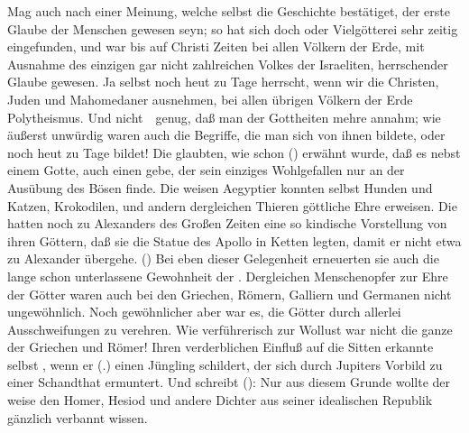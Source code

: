 \begin{aufza}
\item Mag auch nach einer Meinung, welche selbst die Geschichte bestätiget, der erste Glaube der Menschen  gewesen seyn; so hat sich doch  oder Vielgötterei sehr zeitig eingefunden, und war bis auf Christi Zeiten bei allen Völkern der Erde, mit Ausnahme des einzigen gar nicht zahlreichen Volkes der Israeliten, herrschender Glaube gewesen. Ja selbst noch heut zu Tage herrscht, wenn wir die Christen, Juden und Mahomedaner ausnehmen, bei allen übrigen Völkern der Erde Polytheismus. Und nicht~\ genug, daß man der Gottheiten mehre annahm; wie äußerst unwürdig waren auch die Begriffe, die man sich von ihnen bildete, oder noch heut zu Tage bildet! Die  glaubten, wie schon () erwähnt wurde, daß es nebst einem  Gotte, auch einen  gebe, der sein einziges Wohlgefallen nur an der Ausübung des Bösen finde. Die weisen Aegyptier konnten selbst Hunden und Katzen, Krokodilen, und andern dergleichen Thieren göttliche Ehre erweisen. Die  hatten noch zu Alexanders des Großen Zeiten eine so kindische Vorstellung von ihren Göttern, daß sie die Statue des Apollo in Ketten legten, damit er nicht etwa zu Alexander übergehe. () Bei eben dieser Gelegenheit erneuerten sie auch die lange schon unterlassene Gewohnheit der . Dergleichen Menschenopfer zur Ehre der Götter waren auch bei den Griechen, Römern, Galliern und Germanen nicht ungewöhnlich. Noch gewöhnlicher aber war es, die Götter durch allerlei Ausschweifungen zu verehren. Wie verführerisch zur Wollust war nicht die ganze  der Griechen und Römer! Ihren verderblichen Einfluß auf die Sitten erkannte selbst , wenn er (.) einen Jüngling schildert, der sich durch Jupiters Vorbild zu einer Schandthat ermuntert. Und  schreibt ():  Nur aus diesem Grunde wollte der weise  den Homer, Hesiod und andere Dichter aus seiner idealischen Republik gänzlich verbannt wissen.

\end{aufza}
